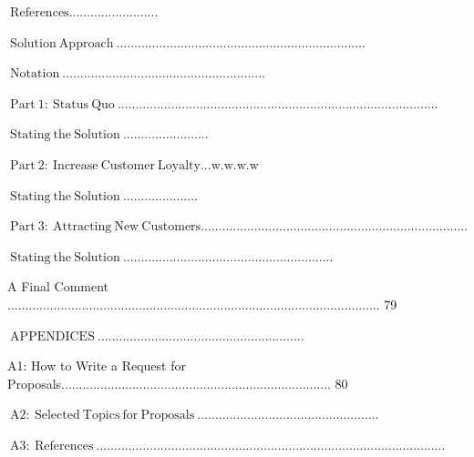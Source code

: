 \documentclass[10pt]{article}
\begin{document}
$\mathrm{~ R e f e r e n c e s . . . . . . . . . . . . . . . . . . . . . . . . .}$

$\mathrm{~ S o l u t i o n ~ A p p r o a c h ~ . . . . . . . . . . . . . . . . . . . . . . . . . . . . . . . . . . . . . . . . . . . . . . . . . . . . . . . . . . . . . . . . . . . . . .}$

$\mathrm{~ N o t a t i o n ~ . . . . . . . . . . . . . . . . . . . . . . . . . . . . . . . . . . . . . . . . . . . . . . . . . . . . . . . . .}$

$\mathrm{~ P a r t ~ 1 : ~ S t a t u s ~ Q u o ~ . . . . . . . . . . . . . . . . . . . . . . . . . . . . . . . . . . . . . . . . . . . . . . . . . . . . . . . . . . . . . . . . . . . . . . . . . . . . . . . . . . . . . . . . . .}$

$\mathrm{~ S t a t i n g ~ t h e ~ S o l u t i o n ~ . . . . . . . . . . . . . . . . . . . . . . . .}$

$\mathrm{~ P a r t ~ 2 : ~ I n c r e a s e ~ C u s t o m e r ~ L o y a l t y . . . w . w . w . w}$

$\mathrm{~ S t a t i n g ~ t h e ~ S o l u t i o n ~ . . . . . . . . . . . . . . . . . . . . .}$

$\mathrm{~ P a r t ~ 3 : ~ A t t r a c t i n g ~ N e w ~ C u s t o m e r s . . . . . . . . . . . . . . . . . . . . . . . . . . . . . . . . . . . . . . . . . . . . . . . . . . . . . . . . . . . . . . . . . . . . . . . . . . .}$

$\mathrm{~ S t a t i n g ~ t h e ~ S o l u t i o n ~ . . . . . . . . . . . . . . . . . . . . . . . . . . . . . . . . . . . . . . . . . . . . . . . . . . . . . . . . . . .}$

A Final Comment ......................................................................................................... 79

$\mathrm{~ A P P E N D I C E S ~ . . . . . . . . . . . . . . . . . . . . . . . . . . . . . . . . . . . . . . . . . . . . . . . . . . . . . . . . . .}$

A1: How to Write a Request for Proposals............................................................................ 80

$\mathrm{~ A 2 : ~ S e l e c t e d ~ T o p i c s ~ f o r ~ P r o p o s a l s ~ . . . . . . . . . . . . . . . . . . . . . . . . . . . . . . . . . . . . . . . . . . . . . . . . . . .}$

$\mathrm{~ A 3 : ~ R e f e r e n c e s ~ . . . . . . . . . . . . . . . . . . . . . . . . . . . . . . . . . . . . . . . . . . . . . . . . . . . . . . . . . . . . . . . . . . . . . . . . . . . . . . . . . . . . . . . . . . . . . . . . . .}$
\end{document}
